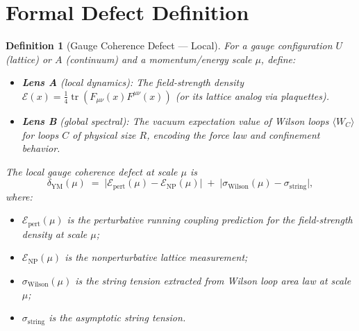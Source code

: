\documentclass[11pt]{article}
\newtheorem{definition}[lemma]{Definition}
\theoremstyle{definition}
\DeclareMathOperator{\tr}{tr}
\begin{document}
\section{Formal Defect Definition}

\begin{definition}[Gauge Coherence Defect --- Local]
\label{def:local-ym-defect}
For a gauge configuration $U$ (lattice) or $A$ (continuum) and a momentum/energy
scale $\mu$, define:
\begin{itemize}
  \item \textbf{Lens A} (local dynamics): The field-strength density
    $\mathcal{E}(x) = \frac{1}{4} \tr(F_{\mu\nu}(x) F^{\mu\nu}(x))$
    (or its lattice analog via plaquettes).
  \item \textbf{Lens B} (global spectral): The vacuum expectation value
    of Wilson loops $\langle W_C \rangle$ for loops $C$ of physical size $R$,
    encoding the force law and confinement behavior.
\end{itemize}

The \emph{local gauge coherence defect} at scale $\mu$ is
\[
  \delta_{\mathrm{YM}}(\mu) \;=\;
  \bigl| \mathcal{E}_{\mathrm{pert}}(\mu) - \mathcal{E}_{\mathrm{NP}}(\mu) \bigr|
  \;+\; \bigl| \sigma_{\mathrm{Wilson}}(\mu) - \sigma_{\mathrm{string}} \bigr|,
\]
where:
\begin{itemize}
  \item $\mathcal{E}_{\mathrm{pert}}(\mu)$ is the perturbative running coupling
    prediction for the field-strength density at scale $\mu$;
  \item $\mathcal{E}_{\mathrm{NP}}(\mu)$ is the nonperturbative lattice measurement;
  \item $\sigma_{\mathrm{Wilson}}(\mu)$ is the string tension extracted from
    Wilson loop area law at scale $\mu$;
  \item $\sigma_{\mathrm{string}}$ is the asymptotic string tension.
\end{itemize}
\end{definition}
\end{document}
